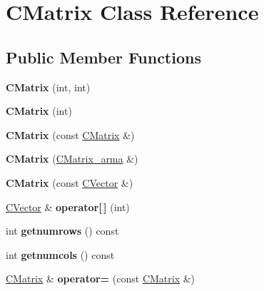 \hypertarget{class_c_matrix}{}\section{C\+Matrix Class Reference}
\label{class_c_matrix}
\subsection*{Public Member Functions}
\begin{DoxyCompactItemize}
\item 
\mbox{\label{class_c_matrix_a24c7f8f49772cfa54580b7ee356e27e3}} 
{\bfseries C\+Matrix} (int, int)
\item 
\mbox{\label{class_c_matrix_a43d24d5e430167b9d7004650cf525017}} 
{\bfseries C\+Matrix} (int)
\item 
\mbox{\label{class_c_matrix_adbc7363cf7f7be9436964bbc1d6c59a2}} 
{\bfseries C\+Matrix} (const \hyperlink{class_c_matrix}{C\+Matrix} \&)
\item 
\mbox{\label{class_c_matrix_a6b65e635e3ab9f9a596df39983a790ed}} 
{\bfseries C\+Matrix} (\hyperlink{class_c_matrix__arma}{C\+Matrix\+\_\+arma} \&)
\item 
\mbox{\label{class_c_matrix_aeec8a7721eee0728f6179e9d5dde9e3e}} 
{\bfseries C\+Matrix} (const \hyperlink{class_c_vector}{C\+Vector} \&)
\item 
\mbox{\label{class_c_matrix_a5b14eeee88acf08294560ccb75c88a10}} 
\hyperlink{class_c_vector}{C\+Vector} \& {\bfseries operator\mbox{[}$\,$\mbox{]}} (int)
\item 
\mbox{\label{class_c_matrix_a39d3861add523545cb0e299897eeb7c7}} 
int {\bfseries getnumrows} () const
\item 
\mbox{\label{class_c_matrix_a9cb6c7606f68dbd924febd0e23a2d345}} 
int {\bfseries getnumcols} () const
\item 
\mbox{\label{class_c_matrix_ad12b4e65d6b23b3f482256985f6a10f3}} 
\hyperlink{class_c_matrix}{C\+Matrix} \& {\bfseries operator=} (const \hyperlink{class_c_matrix}{C\+Matrix} \&)

\end{DoxyCompactItemize}
